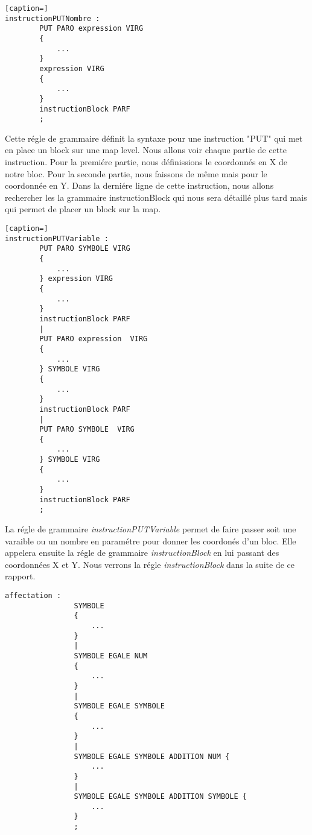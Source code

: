 \newpage

\lstset{style=mystyle}
\begin{lstlisting}[caption=]
instructionPUTNombre : 
        PUT PARO expression VIRG  
        {
            ...
        } 
        expression VIRG 
        {
            ...
        }
        instructionBlock PARF
        ;
\end{lstlisting}

Cette régle de grammaire définit la syntaxe pour une instruction "PUT" qui met en place un block sur une map level.
Nous allons voir chaque partie de cette instruction.
Pour la premiére partie, nous définissions le coordonnés en X de notre bloc. Pour la seconde partie, nous faissons de même mais pour le coordonnée en Y. Dans la derniére ligne de cette instruction, nous allons rechercher les la grammaire instructionBlock qui nous sera détaillé plus tard mais qui permet de placer un block sur la map.

\lstset{style=mystyle}
\begin{lstlisting}[caption=]
instructionPUTVariable :
        PUT PARO SYMBOLE VIRG
        {
            ...
        } expression VIRG 
        {
            ...
        }
        instructionBlock PARF
        |
        PUT PARO expression  VIRG
        {
            ...
        } SYMBOLE VIRG 
        {
            ...
        }
        instructionBlock PARF
        |
        PUT PARO SYMBOLE  VIRG
        {
            ...
        } SYMBOLE VIRG 
        {
            ...
        }
        instructionBlock PARF
        ;   
\end{lstlisting}

La régle de grammaire \textit{instructionPUTVariable} permet de faire passer soit une varaible ou un nombre en paramétre pour donner les coordonés d'un bloc. Elle appelera ensuite la régle de grammaire \textit{instructionBlock} en lui passant des coordonnées X et Y. Nous verrons la régle \textit{instructionBlock} dans la suite de ce rapport.

\lstset{style=mystyle}
\begin{lstlisting}[caption=Affectation d'un symbole]
    affectation : 
                SYMBOLE 
                {
                    ...
                }
                |
                SYMBOLE EGALE NUM 
                {
                    ...
                }
                |
                SYMBOLE EGALE SYMBOLE 
                {
                    ...
                }
                |
                SYMBOLE EGALE SYMBOLE ADDITION NUM {
                    ...
                }
                |
                SYMBOLE EGALE SYMBOLE ADDITION SYMBOLE {
                    ...
                }
                ;
\end{lstlisting}

